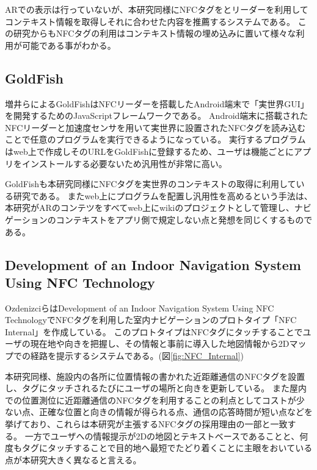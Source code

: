 ARでの表示は行っていないが、本研究同様にNFCタグをとリーダーを利用してコンテキスト情報を取得しそれに合わせた内容を推薦するシステムである。
この研究からもNFCタグの利用はコンテキスト情報の埋め込みに置いて様々な利用が可能である事がわかる。


\subsection{GoldFish}
増井らによるGoldFish\cite{10.1145/2407696.2407699}はNFCリーダーを搭載したAndroid端末で「実世界GUI」を開発するためのJavaScriptフレームワークである。
Android端末に搭載されたNFCリーダーと加速度センサを用いて実世界に設置されたNFCタグを読み込むことで任意のプログラムを実行できるようになっている。
実行するプログラムはweb上で作成しそのURLをGoldFishに登録するため、ユーザは機能ごとにアプリをインストールする必要ないため汎用性が非常に高い。

GoldFishも本研究同様にNFCタグを実世界のコンテキストの取得に利用している研究である。
またweb上にプログラムを配置し汎用性を高めるという手法は、本研究がARのコンテツをすべてweb上にwikiのプロジェクトとして管理し、ナビゲーションのコンテキストをアプリ側で規定しない点と発想を同じくするものである。

\subsection{Development of an Indoor Navigation System Using NFC Technology}
OzdenizciらはDevelopment of an Indoor Navigation System Using NFC Technology\cite{5954491}でNFCタグを利用した室内ナビゲーションのプロトタイプ「NFC Internal」を作成している。
このプロトタイプはNFCタグにタッチすることでユーザの現在地や向きを把握し、その情報と事前に導入した地図情報から2Dマップでの経路を提示するシステムである。(図\ref{fig:NFC_Internal})

本研究同様、施設内の各所に位置情報の書かれた近距離通信のNFCタグを設置し、タグにタッチされるたびにユーザの場所と向きを更新している。
また屋内での位置測位に近距離通信のNFCタグを利用することの利点としてコストが少ない点、正確な位置と向きの情報が得られる点、通信の応答時間が短い点などを挙げており、これらは本研究が主張するNFCタグの採用理由の一部と一致する。
一方でユーザへの情報提示が2Dの地図とテキストベースであることと、何度もタグにタッチすることで目的地へ最短でたどり着くことに主眼をおいている点が本研究大きく異なると言える。

